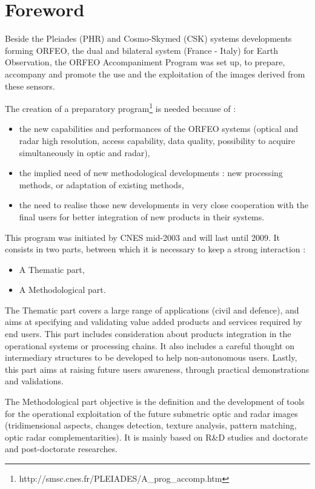 \chapter*{Foreword}
\noindent
   	

Beside the Pleiades (PHR) and Cosmo-Skymed (CSK) systems developments forming ORFEO, the dual and bilateral system (France - Italy) for Earth Observation, the ORFEO Accompaniment Program was set up, to prepare, accompany and promote the use and the exploitation of the images derived from these sensors.

The creation of a preparatory program\footnote{http://smsc.cnes.fr/PLEIADES/A\_prog\_accomp.htm} is needed because of :
\begin{itemize}
\item the new capabilities and performances of the ORFEO systems (optical and radar high resolution, access capability, data quality, possibility to acquire simultaneously in optic and radar),
\item the implied need of new methodological developments : new processing methods, or adaptation of existing methods,
\item the need to realise those new developments in very close
  cooperation with the final users for better integration of new
  products in their systems.
  
\end{itemize}

This program was initiated by CNES mid-2003 and will last until 2009.
It consists in two parts, between which it is necessary to keep a strong interaction :
\begin{itemize}
\item A Thematic part,
\item A Methodological part.
\end{itemize}

The Thematic part covers a large range of applications (civil and
defence), and aims at specifying and validating value added
products and services required by end users. This part includes
consideration about products integration in the operational systems or
processing chains. It also includes a careful thought on intermediary
structures to be developed to help non-autonomous users. Lastly, this part aims at raising future users awareness, through practical demonstrations and validations.

The Methodological part objective is the definition and the
development of tools for the operational exploitation of the future
submetric optic and radar images (tridimensional aspects, changes
detection, texture analysis, pattern matching, optic radar
complementarities). It is mainly based on R\&D studies and doctorate
and post-doctorate researches.

